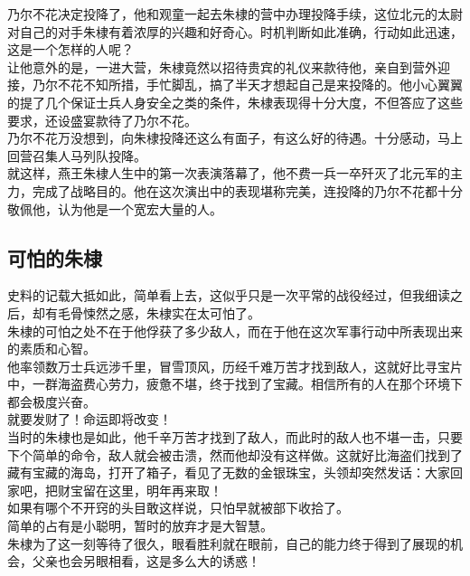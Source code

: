 \begin{multicols}{\theparacolNo}
乃尔不花决定投降了，他和观童一起去朱棣的营中办理投降手续，这位北元的太尉对自己的对手朱棣有着浓厚的兴趣和好奇心。时机判断如此准确，行动如此迅速，这是一个怎样的人呢？\\

让他意外的是，一进大营，朱棣竟然以招待贵宾的礼仪来款待他，亲自到营外迎接，乃尔不花不知所措，手忙脚乱，搞了半天才想起自己是来投降的。他小心翼翼的提了几个保证士兵人身安全之类的条件，朱棣表现得十分大度，不但答应了这些要求，还设盛宴款待了乃尔不花。\\

乃尔不花万没想到，向朱棣投降还这么有面子，有这么好的待遇。十分感动，马上回营召集人马列队投降。\\

就这样，燕王朱棣人生中的第一次表演落幕了，他不费一兵一卒歼灭了北元军的主力，完成了战略目的。他在这次演出中的表现堪称完美，连投降的乃尔不花都十分敬佩他，认为他是一个宽宏大量的人。\\

\subsection{可怕的朱棣}
史料的记载大抵如此，简单看上去，这似乎只是一次平常的战役经过，但我细读之后，却有毛骨悚然之感，朱棣实在太可怕了。\\

朱棣的可怕之处不在于他俘获了多少敌人，而在于他在这次军事行动中所表现出来的素质和心智。\\

他率领数万士兵远涉千里，冒雪顶风，历经千难万苦才找到敌人，这就好比寻宝片中，一群海盗费心劳力，疲惫不堪，终于找到了宝藏。相信所有的人在那个环境下都会极度兴奋。\\

就要发财了！命运即将改变！\\

当时的朱棣也是如此，他千辛万苦才找到了敌人，而此时的敌人也不堪一击，只要下个简单的命令，敌人就会被击溃，然而他却没有这样做。这就好比海盗们找到了藏有宝藏的海岛，打开了箱子，看见了无数的金银珠宝，头领却突然发话：大家回家吧，把财宝留在这里，明年再来取！\\

如果有哪个不开窍的头目敢这样说，只怕早就被部下收拾了。\\

简单的占有是小聪明，暂时的放弃才是大智慧。\\

朱棣为了这一刻等待了很久，眼看胜利就在眼前，自己的能力终于得到了展现的机会，父亲也会另眼相看，这是多么大的诱惑！\\


\end{multicols}
